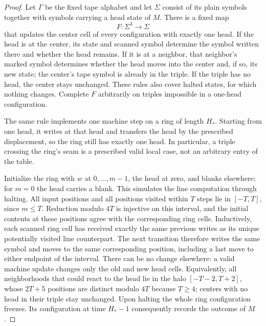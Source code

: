 \begin{proof}
Let $\Gamma$ be the fixed tape alphabet and let $\Sigma$ consist of its
plain symbols together with symbols carrying a head state of $M$. There
is a fixed map
\[
 F:\Sigma^3\longrightarrow\Sigma
\]
that updates the center cell of every configuration with exactly one head.
If the head is at the center, its state and scanned symbol determine the
symbol written there and whether the head remains. If it is at a neighbor,
that neighbor's marked symbol determines whether the head moves into the
center and, if so, its new state; the center's tape symbol is already in
the triple. If the triple has no head, the center stays unchanged. These
rules also cover halted states, for which nothing changes. Complete $F$
arbitrarily on triples impossible in a one-head configuration.

The same rule implements one machine step on a ring of length $H_*$.
Starting from one head, it writes at that head and transfers the head by
the prescribed displacement, so the ring still has exactly one head.
In particular, a triple crossing the ring's seam is a prescribed valid
local case, not an arbitrary entry of the table.

Initialize the ring with $w$ at $0,\ldots,m-1$, the head at zero, and
blanks elsewhere; for $m=0$ the head carries a blank. This simulates the
line computation through halting. All input positions and all positions
visited within $T$ steps lie in $[-T,T]$, since $m\le T$. Reduction modulo
$4T$ is injective on this interval, and the initial contents at these
positions agree with the corresponding ring cells. Inductively, each
scanned ring cell has received exactly the same previous writes as its
unique potentially visited line counterpart. The next transition
therefore writes the same symbol and moves to the same corresponding
position, including a last move to either endpoint of the interval.
There can be no change elsewhere: a valid machine update changes only
the old and new head cells. Equivalently, all neighborhoods that could
react to the head lie in the halo $[-T-2,T+2]$, whose $2T+5$ positions are
distinct modulo $4T$ because $T\ge4$; centers with no head in their triple
stay unchanged. Upon halting the whole ring configuration freezes.
Its configuration at time $H_*-1$ consequently records the outcome of $M$.


\end{proof}
